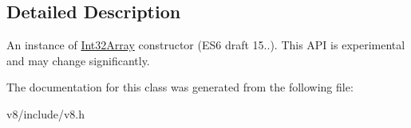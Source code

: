 \subsection{Detailed Description}
An instance of \hyperlink{classv8_1_1Int32Array}{Int32\+Array} constructor (E\+S6 draft 15..). This A\+P\+I is experimental and may change significantly. 

The documentation for this class was generated from the following file\+:\begin{DoxyCompactItemize}
\item 
v8/include/v8.\+h\end{DoxyCompactItemize}
